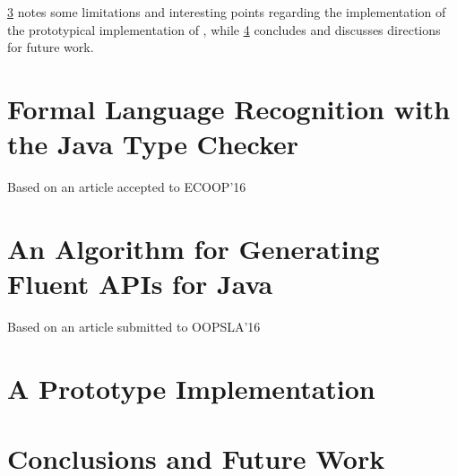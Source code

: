 \documentclass[12pt]{book}
\begin{document}
\cref{chapter:prototype} notes some limitations and interesting points
regarding the implementation of the prototypical implementation of \Fajita,
while \cref{chapter:conclusions} concludes and discusses directions for future
work.

\chapter{Formal Language Recognition with the Java Type Checker}
\Large Based on an article accepted to ECOOP'16~\cite{Gil:Levy:2016}
\label{chapter:ecoop}
\normalsize


\chapter{An Algorithm for Generating Fluent APIs for Java}
\Large Based on an article submitted to OOPSLA'16~\cite{Gil:Levy:2016a}
\label{chapter:oopsla}
\normalsize


\chapter{A Prototype Implementation}
\label{chapter:prototype}
%

\chapter{Conclusions and Future Work}
\label{chapter:conclusions}


\begin{comment} %
\end{comment} %



\end{document}
